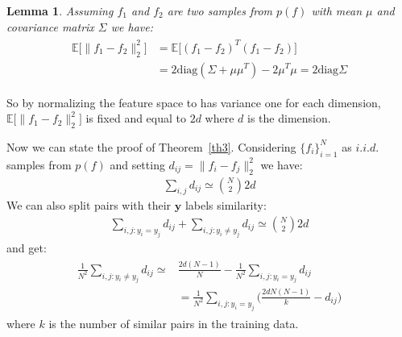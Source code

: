 \documentclass[10pt,journal,compsoc]{IEEEtran}
\newtheorem{lemma}[theorem]{Lemma}
\begin{document}
\begin{lemma}
	Assuming $f_1$ and $f_2$ are two samples from $p(f)$ with mean $\mu$ and covariance matrix $\Sigma$ we have:
	\begin{align*}
	\begin{split}
	\mathds{E} \Big[ \|f_1 - f_2\|_2^2 \Big] &= \mathds{E} \Big[(f_1-f_2)^T(f_1-f_2)\Big]\\ &= 2 \text{diag}(\Sigma + \mu \mu^T) - 2\mu^T \mu = 2 \text{diag}\Sigma
	\end{split}
	\end{align*}
\end{lemma}
So by normalizing the feature space to has variance one for each dimension, $\mathds{E} \Big[ \|f_1 - f_2\|_2^2 \Big]$ is fixed and equal to $2d$ where $d$ is the dimension.

Now we can state the proof of Theorem~\ref{th3}. Considering $\{f_i\}_{i=1}^N$ as $i.i.d.$ samples from $p(f)$ and setting $d_{ij} = \|f_i - f_j\|_2^2$ we have:
\begin{align*}
\sum_{i,j} d_{ij} \simeq \binom{N}{2} 2d
\end{align*}
We can also split pairs with their $\textbf{y}$ labels similarity:
\begin{align*}
\sum_{i,j: y_i=y_j} d_{ij} + \sum_{i,j: y_i\neq y_j} d_{ij}  \simeq \binom{N}{2} 2d
\end{align*}
and get:
\begin{align*}
\begin{split}
\frac{1}{N^2}\sum_{i,j: y_i\neq y_j} d_{ij}   \simeq &\frac{2d(N-1)}{N} - \frac{1}{N^2}\sum_{i,j: y_i= y_j} d_{ij}\\
& = \frac{1}{N^2} \sum_{i,j: y_i= y_j}\big( \frac{2dN(N-1)}{k} - d_{ij} \big)
\end{split}
\end{align*}
where $k$ is the number of similar pairs in the training data.  



%

% 
\end{document}
